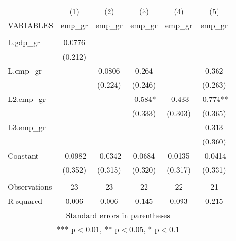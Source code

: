 \documentclass[]{article}
\begin{document}
\begin{tabular}{lccccc} \hline
 & (1) & (2) & (3) & (4) & (5) \\
VARIABLES & emp\_gr & emp\_gr & emp\_gr & emp\_gr & emp\_gr \\ \hline
 &  &  &  &  &  \\
L.gdp\_gr & 0.0776 &  &  &  &  \\
 & (0.212) &  &  &  &  \\
L.emp\_gr &  & 0.0806 & 0.264 &  & 0.362 \\
 &  & (0.224) & (0.246) &  & (0.263) \\
L2.emp\_gr &  &  & -0.584* & -0.433 & -0.774** \\
 &  &  & (0.333) & (0.303) & (0.365) \\
L3.emp\_gr &  &  &  &  & 0.313 \\
 &  &  &  &  & (0.360) \\
Constant & -0.0982 & -0.0342 & 0.0684 & 0.0135 & -0.0414 \\
 & (0.352) & (0.315) & (0.320) & (0.317) & (0.331) \\
 &  &  &  &  &  \\
Observations & 23 & 23 & 22 & 22 & 21 \\
 R-squared & 0.006 & 0.006 & 0.145 & 0.093 & 0.215 \\ \hline
\multicolumn{6}{c}{ Standard errors in parentheses} \\
\multicolumn{6}{c}{ *** p$<$0.01, ** p$<$0.05, * p$<$0.1} \\
\end{tabular}
\end{document}
